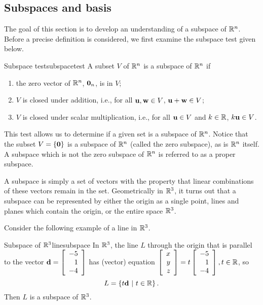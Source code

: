 \subsection{Subspaces and basis}

The goal of this section is to develop an understanding of a subspace of $\mathbb{R}^n$. Before a precise definition is considered, we first examine the subspace test given below.

\begin{theorem}{Subspace test}{subspacetest}
A subset $V$ of $\mathbb{R}^n$ is a subspace of $\mathbb{R}^n$ if 
\begin{enumerate}
\item the zero vector of $\mathbb{R}^n$, ${\bf 0}_n$, is in $V$;
\item $V$ is closed under addition, i.e., for all ${\bf u},{\bf w}\in V$, ${\bf u}+{\bf w}\in V$;
\item $V$ is closed under scalar multiplication, i.e., for all ${\bf u}\in V$
and $k\in\mathbb{R}$, $k{\bf u}\in V$.
\end{enumerate}
\end{theorem}

This test allows us to determine if a given set is a subspace of $\mathbb{R}^n$. Notice that the subset $V = \left\{ {\bf 0} \right\}$ is a subspace of $\mathbb{R}^n$ (called the zero subspace), as is $\mathbb{R}^n$ itself. A subspace which is not the zero subspace of $\mathbb{R}^n$ is referred to as a proper subspace.

 A subspace is simply a set of vectors with the property that linear
combinations of these vectors remain in the set. Geometrically in
$\mathbb{R}^{3}$, it turns out that a subspace can be represented by
either the origin as a single point, lines and planes which contain
the origin, or the entire space $\mathbb{R}^{3}$. 

Consider the following example of a line in $\mathbb{R}^3$. 

\begin{example}{Subspace of $\mathbb{R}^3$}{linesubspace}
In $\mathbb{R}^3$, the line $L$ through the origin that is
parallel to the vector
${{\bf d}}= \left[ \begin{array}{r} -5 \\ 1 \\ -4 \end{array}\right]$ 
has (vector) equation
$\left[ \begin{array}{r} x \\ y \\ z \end{array}\right]
=t\left[ \begin{array}{r} -5 \\ 1 \\ -4 \end{array}\right], t\in\mathbb{R}$,
so 
\[ L=\left\{ t{{\bf d}} ~|~ t\in\mathbb{R}\right\}.\] Then $L$ is a subspace of $\mathbb{R}^3$.  
\end{example}

